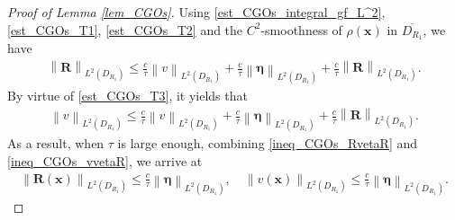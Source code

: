 \documentclass[11pt,reqno,oneside]{amsart}
\theoremstyle{definition}
\theoremstyle{remark}
\numberwithin{equation}{section}
\numberwithin{equation}{section}
\theoremstyle{remark}
\begin{document}
\begin{proof}[Proof of Lemma \ref{lem_CGOs}]
	 
	Using \eqref{est_CGOs_integral_gf_L^2}, \eqref{est_CGOs_T1}, \eqref{est_CGOs_T2} and the $ C^2 $-smoothness of $ \rho\left(\mathbf{x}\right) $ in $ \overline{D_{R_1}} $, we have
	\begin{align} \label{ineq_CGOs_RvetaR}
		\left\| \mathbf{R} \right\|_{L^2\left(D_{R_1}\right)} \leqslant \frac{c}{\tau} \left\| v \right\|_{L^2\left(D_{R_1}\right)} + \frac{c}{\tau} \left\| \bm{\eta} \right\|_{L^2\left(D_{R_1}\right)} + \frac{c}{\tau} \left\| \mathbf{R} \right\|_{L^2\left(D_{R_1}\right)}.
	\end{align}
	By virtue of \eqref{est_CGOs_T3}, it yields that
	\begin{align} \label{ineq_CGOs_vvetaR}
		\left\| v \right\|_{L^2\left(D_{R_1}\right)} \leqslant \frac{c}{\tau} \left\| v \right\|_{L^2\left(D_{R_1}\right)} + \frac{c}{\tau} \left\| \bm{\eta} \right\|_{L^2\left(D_{R_1}\right)} + \frac{c}{\tau} \left\| \mathbf{R} \right\|_{L^2\left(D_{R_1}\right)}.
	\end{align} 
	As a result, when $ \tau $ is large enough, combining \eqref{ineq_CGOs_RvetaR} and \eqref{ineq_CGOs_vvetaR}, we arrive at 
	\begin{align} \label{est_CGOs_R_v_L^2}
		\left\| \mathbf{R}\left(\mathbf{x}\right) \right\|_{L^2\left(D_{R_1}\right)} \leqslant \frac{c}{\tau} \left\| \bm{\eta} \right\|_{L^2\left(D_{R_1}\right)}, \quad \left\| v\left(\mathbf{x}\right) \right\|_{L^2\left(D_{R_1}\right)} \leqslant \frac{c}{\tau} \left\| \bm{\eta} \right\|_{L^2\left(D_{R_1}\right)}.
	\end{align}
	

\end{proof}
\end{document}
